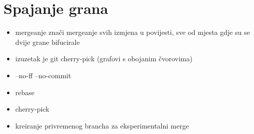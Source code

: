 \chapter*{Spajanje grana}

\begin{itemize}
   \item mergeanje znači mergeanje svih izmjena u povijesti, sve od mjesta gdje su se dvije grane bifucirale
   \item izuzetak je git cherry-pick (grafovi s obojanim čvorovima)
   \item --no-ff --no-commit
   \item rebase
   \item cherry-pick
   \item kreiranje privremenog brancha za eksperimentalni merge
\end{itemize}


